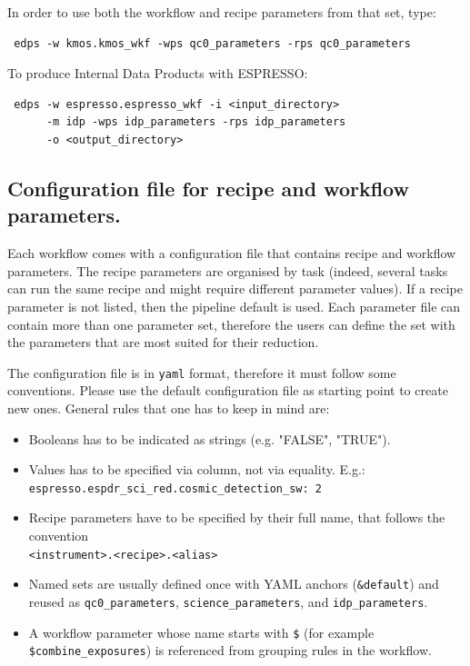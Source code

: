 In order to use both the workflow and recipe parameters from that set, type: 
\begin{verbatim}
 edps -w kmos.kmos_wkf -wps qc0_parameters -rps qc0_parameters
\end{verbatim}

To produce Internal Data Products with ESPRESSO:
\begin{verbatim}
 edps -w espresso.espresso_wkf -i <input_directory>
      -m idp -wps idp_parameters -rps idp_parameters
      -o <output_directory>
\end{verbatim}


\subsection{Configuration file for recipe and workflow parameters.}
\label{sec:edps_parameters_file}

Each workflow comes with a configuration file that contains recipe and workflow parameters. The recipe parameters are organised by task (indeed, several tasks can run the same recipe and might require different parameter values). If a recipe parameter is not listed, then the pipeline default is used. 
Each parameter file can contain more than one parameter set, therefore the users can define the set with the parameters that are most suited for their reduction. 


The configuration file is in {\tt yaml} format, therefore it must follow some conventions. Please use the default configuration file as starting point to create new ones. General rules that one has to keep in mind are:

\begin{itemize}
    \item Booleans has to be indicated as strings (e.g. "FALSE", "TRUE").
    \item Values has to be specified via column, not via equality. E.g.:\\ {\tt espresso.espdr\_sci\_red.cosmic\_detection\_sw: 2}
    \item Recipe parameters have to be specified by their full name, that follows the convention \\ {\tt <instrument>.<recipe>.<alias>}
    \item Named sets are usually defined once with YAML anchors ({\tt \&default}) and reused as {\tt qc0\_parameters}, {\tt science\_parameters}, and {\tt idp\_parameters}.
    \item A workflow parameter whose name starts with {\tt \$} (for example {\tt \$combine\_exposures}) is referenced from grouping rules in the workflow.
\end{itemize}

